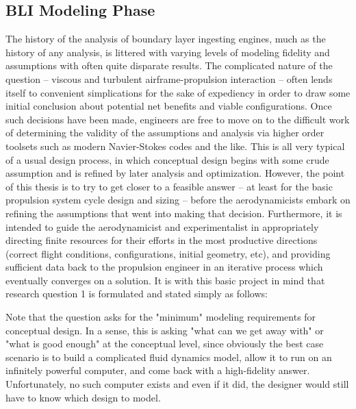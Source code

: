		\subsection{BLI Modeling Phase}
			The history of the analysis of boundary layer ingesting engines, much as the history of any analysis, is littered with varying levels of modeling fidelity and assumptions with often quite disparate results.  The complicated nature of the question -- viscous and turbulent airframe-propulsion interaction -- often lends itself to convenient simplications for the sake of expediency in order to draw some initial conclusion about potential net benefits and viable configurations.  Once such decisions have been made, engineers are free to move on to the difficult work of determining the validity of the assumptions and analysis via higher order toolsets such as modern Navier-Stokes codes and the like.  This is all very typical of a usual design process, in which conceptual design begins with some crude assumption and is refined by later analysis and optimization.  However, the point of this thesis is to try to get closer to a feasible answer -- at least for the basic propulsion system cycle design and sizing -- before the aerodynamicists embark on refining the assumptions that went into making that decision.  Furthermore, it is intended to guide the aerodynamicist and experimentalist in appropriately directing finite resources for their efforts in the most productive directions (correct flight conditions, configurations, initial geometry, etc), and providing sufficient data back to the propulsion engineer in an iterative process which eventually converges on a solution.  It is with this basic project in mind that research question 1 is formulated and stated simply as follows:
			\vspace{25pt}
			\vspace{5mm}
			\vspace{5mm}
	
			Note that the question asks for the "minimum" modeling requirements for conceptual design.  In a sense, this is asking "what can we get away with" or "what is good enough" at the conceptual level, since obviously the best case scenario is to build a complicated fluid dynamics model, allow it to run on an infinitely powerful computer, and come back with a high-fidelity answer.  Unfortunately, no such computer exists and even if it did, the designer would still have to know which design to model.
			

